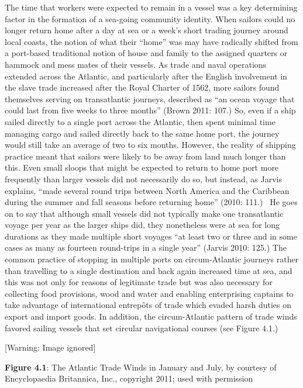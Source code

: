 \begin{styleStandard}
The time that workers were expected to remain in a vessel was a key determining factor in the formation of a sea-going community identity. When sailors could no longer return home after a day at sea or a week’s short trading journey around local coasts, the notion of what their “home” was may have radically shifted from a port-based traditional notion of house and family to the assigned quarters or hammock and mess mates of their vessels. As trade and naval operations extended across the Atlantic, and particularly after the English involvement in the slave trade increased after the Royal Charter of 1562, more sailors found themselves serving on transatlantic journeys, described as “an ocean voyage that could last from five weeks to three months” (Brown 2011: 107.) So, even if a ship sailed directly to a single port across the Atlantic, then spent minimal time managing cargo and sailed directly back to the same home port, the journey would still take an average of two to six months. However, the reality of shipping practice meant that sailors were likely to be away from land much longer than this. Even small sloops that might be expected to return to home port more frequently than larger vessels did not necessarily do so, but instead, as Jarvis explains, “made several round trips between North America and the Caribbean during the summer and fall seasons before returning home” (2010: 111.) \ He goes on to say that although small vessels did not typically make one transatlantic voyage per year as the larger ships did, they nonetheless were at sea for long durations as they made multiple short voyages “at least two or three and in some cases as many as fourteen round-trips in a single year” (Jarvis 2010: 125.) The common practice of stopping in multiple ports on circum-Atlantic journeys rather than travelling to a single destination and back again increased time at sea, and this was not only for reasons of legitimate trade but was also necessary for collecting food provisions, wood and water and enabling enterprising captains to take advantage of international entrepôts of trade which evaded harsh duties on export and import goods. In addition, the circum-Atlantic pattern of trade winds favored sailing vessels that set circular navigational courses (see Figure 4.1.) 
\end{styleStandard}

\begin{center}
 [Warning: Image ignored] %

\end{center}
\begin{styleStandard}
\textbf{Figure 4.1}: The Atlantic Trade Winds in January and July, by courtesy of Encyclopaedia Britannica, Inc., copyright 2011; used with permission
\end{styleStandard}

